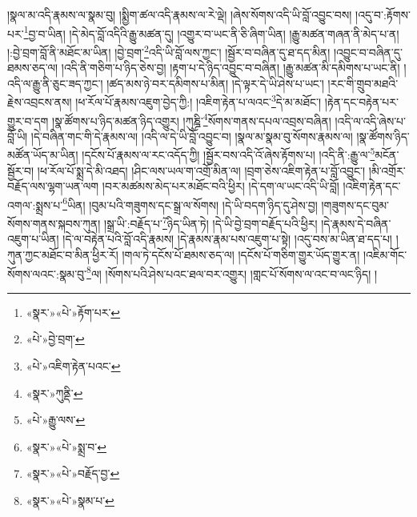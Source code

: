 །སྣལ་མ་འདི་རྣམས་ལ་སྣམ་བུ། །སྨྱིག་ཚལ་འདི་རྣམས་ལ་རེ་ལྡེ། །ཞེས་སོགས་འདི་ཡི་བློ་འབྱུང་བས། །འདུ་བ་:རྟོགས་པར་\footnote{«སྣར་»«པེ་»རྟོག་པར་}བྱ་བ་ཡིན། །དེ་མེད་བློ་འདིའི་རྒྱུ་མཚན་དུ། །འགྱུར་བ་ཡང་ནི་ཅི་ཞིག་ཡིན། །རྒྱུ་མཚན་གཞན་ནི་མེད་པ་ན། །:བྱེ་བྲག་བློ་ནི་མཐོང་མ་ཡིན། །བྱེ་བྲག་\footnote{«པེ་»བྱེ་བྲག་}འདི་ཡི་བློ་ལས་ཀྱང་། །སྦྱོར་བ་བཞིན་དུ་ཐ་དད་མིན། །འབྱུང་བ་བཞིན་དུ་ཐམས་ཅད་ལ། །འདི་ནི་གཅིག་པ་ཉིད་ཅེས་བྱ། །རྟག་པ་དེ་ཉིད་འབྱུང་བ་བཞིན། །རྒྱུ་མཚན་མི་དམིགས་པ་ཡང་ནི། །འདི་ལ་རྒྱུ་ནི་ཅུང་ཟད་ཀྱང་། །ཚད་མས་ཉེ་བར་དམིགས་པ་མིན། །དེ་ལྟར་དེ་ཡི་ཤེས་པ་ཡང་། །རང་གི་གྲུབ་མཐའི་རྗེས་འབྲངས་ནས། །ཕ་རོལ་པོ་རྣམས་འཇུག་བྱེད་ཀྱི:། །འཇིག་རྟེན་པ་ལའང་\footnote{«པེ་»འཇིག་རྟེན་པའང་}དེ་མ་མཐོང་། །རྟེན་དང་བརྟེན་པར་གྱུར་བ་དག །སྣ་ཚོགས་པ་ཉིད་མཚན་ཉིད་འགྱུར། །ཀུཎྜི་\footnote{«སྣར་»ཀུནྡི་}སོགས་གནས་དཔལ་འབྲས་བཞིན། །འདི་ལ་འདི་ཞེས་པ་བློ་ཡི། །དེ་བཞིན་གང་གི་དེ་རྣམས་ལ། །འདི་ལ་དེ་ཡི་བློ་འབྱུང་བ། །སྣལ་མ་སྣམ་བུ་སོགས་རྣམས་ལ། །སྣ་ཚོགས་ཉིད་མཚོན་ཡོད་མ་ཡིན། །དངོས་པོ་རྣམས་ལ་རང་འདོད་ཀྱི། །སྦྱོར་བས་འདི་འོ་ཞེས་རྟོགས་པ། །འདི་ནི་:རྒྱུ་ལ་\footnote{«པེ་»རྒྱུ་ལས་}མངོན་སྦྱོར་བ། །ཕ་རོལ་པོ་སྨྲ་དེ་མི་འཐད། །ཤིང་ལས་ཡལ་ག་འགྲོ་མིན་ལ། །བྲག་ཅེས་འཇིག་རྟེན་པ་བློ་འབྱུང་། །མི་འགྲོར་བརྗོད་ལས་ལྷག་ཡན་ལག །བར་མཚམས་མེད་པར་མཐོང་བའི་ཕྱིར། །དེ་དག་ལ་ཡང་འདི་ཡི་བློ། །འཇིག་རྟེན་དང་འགལ་:སྨྲས་པ་\footnote{«སྣར་»«པེ་»སྨྲ་བ་}ཡིན། །བུམ་པའི་གཟུགས་དང་སྒྲ་ལ་སོགས། །དེ་ཡི་བདག་ཉིད་དུ་ཤེས་བྱ། །གཟུགས་དང་བུམ་སོགས་གནས་སྐབས་ཀུན། །སྒྲ་ཡི་:བརྗོད་པ་\footnote{«སྣར་»«པེ་»བརྗོད་བྱ་}ཉིད་ཡིན་ཏེ། །དེ་ཡི་བྱེ་བྲག་བརྗོད་པའི་ཕྱིར། །དེ་རྣམས་དེ་བཞིན་འཇུག་པ་ཡིན། །དེ་ལ་བརྟེན་པའི་བློ་འདི་རྣམས། །དེ་རྣམས་རྣམ་པས་འཇུག་པ་སྟེ། །འདུ་བས་མ་ཡིན་ཐ་དད་པ། །ཀུན་ཀྱང་མཐོང་བ་མིན་ཕྱིར་རོ། །གལ་ཏེ་དངོས་པོ་ཐམས་ཅད་ལ། །དངོས་པོ་གཅིག་གྱུར་ཡོད་གྱུར་ན། །འཇིམ་གོང་སོགས་ལའང་:སྣམ་བུ་\footnote{«སྣར་»«པེ་»སྣམ་པ་}ལ། །སོགས་པའི་ཤེས་པའང་ཐལ་བར་འགྱུར། །གླང་པོ་སོགས་ལ་འང་བ་ལང་ཉིད། །
